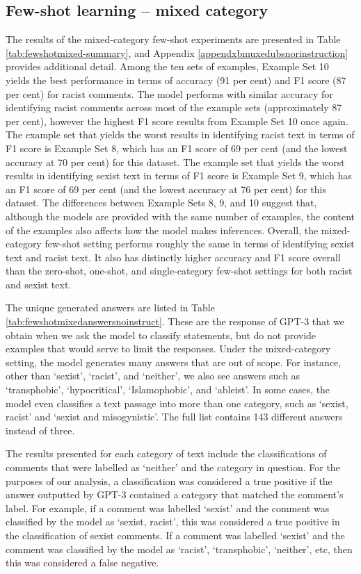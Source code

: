 \documentclass{bmcart}
\begin{document}
\subsection{Few-shot learning -- mixed category}\label{few-shot-learning-mixed-category}

The results of the mixed-category few-shot experiments are presented in Table \ref{tab:fewshotmixed-summary}, and Appendix \ref{appendxbmuxedubsnorinstruction} provides additional detail. Among the ten sets of examples, Example Set 10 yields the best performance in terms of accuracy (91 per cent) and F1 score (87 per cent) for racist comments. The model performs with similar accuracy for identifying racist comments across most of the example sets (approximately 87 per cent), however the highest F1 score results from Example Set 10 once again. The example set that yields the worst results in identifying racist text in terms of F1 score is Example Set 8, which has an F1 score of 69 per cent (and the lowest accuracy at 70 per cent) for this dataset. The example set that yields the worst results in identifying sexist text in terms of F1 score is Example Set 9, which has an F1 score of 69 per cent (and the lowest accuracy at 76 per cent) for this dataset. The differences between Example Sets 8, 9, and 10 suggest that, although the models are provided with the same number of examples, the content of the examples also affects how the model makes inferences. Overall, the mixed-category few-shot setting performs roughly the same in terms of identifying sexist text and racist text. It also has distinctly higher accuracy and F1 score overall than the zero-shot, one-shot, and single-category few-shot settings for both racist and sexist text.



The unique generated answers are listed in Table \ref{tab:fewshotmixedanswersnoinstruct}. These are the response of GPT-3 that we obtain when we ask the model to classify statements, but do not provide examples that would serve to limit the responses. Under the mixed-category setting, the model generates many answers that are out of scope. For instance, other than `sexist', `racist', and `neither', we also see answers such as `transphobic', `hypocritical', `Islamophobic', and `ableist'. In some cases, the model even classifies a text passage into more than one category, such as `sexist, racist' and `sexist and misogynistic'. The full list contains 143 different answers instead of three.

The results presented for each category of text include the classifications of comments that were labelled as `neither' and the category in question. For the purposes of our analysis, a classification was considered a true positive if the answer outputted by GPT-3 contained a category that matched the comment's label. For example, if a comment was labelled `sexist' and the comment was classified by the model as `sexist, racist', this was considered a true positive in the classification of sexist comments. If a comment was labelled `sexist' and the comment was classified by the model as `racist', `transphobic', `neither', etc, then this was considered a false negative.
\end{document}
